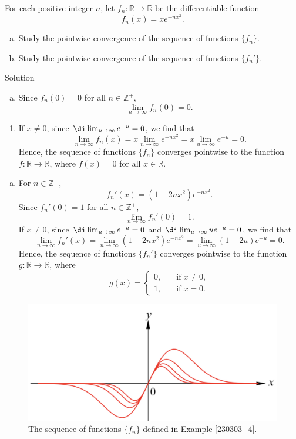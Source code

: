 \begin{example}[label=230303_4]{}
 For each positive integer $n$, let $f_n:\mathbb{R}\to\mathbb{R}$ be the differentiable function \[f_n(x)=xe^{-nx^2}.\]
 \begin{enumerate}[(a)]
 \item  Study the pointwise convergence of the sequence of functions $\{f_n\}$.
 
 \item Study the pointwise convergence of the sequence of functions $\{f_n'\}$.
 \end{enumerate}
\end{example}
\begin{solution}{Solution}
\begin{enumerate} [(a)]
 
\item Since $f_n(0)=0$ for all $n\in\mathbb{Z}^+$,
\[
\lim_{n\to\infty}f_n(0)=0.
\]\end{enumerate}\bs \begin{enumerate}[]\item If $x\neq 0$, since $\di\lim_{u\to\infty}e^{-u}=0$, we find that
\[\lim_{n\to\infty}f_n(x)=x\lim_{n\to\infty}e^{-nx^2}=x\lim_{u\to \infty}e^{-u}=0.\]
Hence, the sequence of functions $\{f_n\}$ converges pointwise to the function $f:\mathbb{R}\to\mathbb{R}$, where $f(x)=0$ for all $x\in\mathbb{R}$.\end{enumerate}\begin{enumerate}[(b)]
\item For $n\in\mathbb{Z}^+$, 
\[f_n'(x)=(1-2nx^2)e^{-nx^2}.\]
Since $f_n'(0)=1$ for all $n\in\mathbb{Z}^+$,
\[
\lim_{n\to\infty}f_n'(0)=1.
\]If $x\neq 0$, since  $\di\lim_{u\to\infty} e^{-u}=0$ and $\di\lim_{u\to\infty}ue^{-u}=0$, we find that
\[\lim_{n\to\infty}f_n'(x)= \lim_{n\to\infty}(1-2nx^2)e^{-nx^2}= \lim_{u\to \infty}(1-2u)e^{-u}=0.\] 
Hence, the sequence of functions $\{f_n'\}$ converges pointwise to the function $g:\mathbb{R}\to\mathbb{R}$, where  \[g(x)=\begin{cases}0,\quad &\text{if}\;x\neq 0,\\1,\quad &\text{if}\; x=0.\end{cases}\]
\end{enumerate}
\end{solution}


\begin{figure}[ht]
\centering
\includegraphics[scale=0.18]{Picture54.png}
\caption{The sequence of functions $\{f_n\}$ defined in Example \ref{230303_4}.\fa}\label{figure54}
\end{figure}

